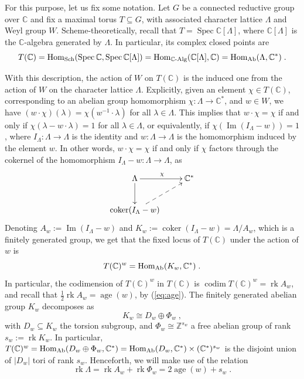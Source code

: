 \documentclass[11pt,english]{amsart}
\numberwithin{equation}{section}
\numberwithin{figure}{section}
\theoremstyle{plain}
\theoremstyle{plain}
\theoremstyle{definition}
\theoremstyle{remark}
\DeclareMathOperator{\image}{Im}
\newcommand{\ZZ}{\mathbb{Z}}
\newcommand{\CC}{\mathbb{C}}
\newcommand{\Spec}{\operatorname{Spec}}
\newcommand{\coker}{\operatorname{coker}}
\newcommand{\codim}{\operatorname{codim}}
\newcommand{\Hom}{\operatorname{Hom}}
\newcommand{\Sch}{\operatorname{Sch}}
\newcommand{\rk}{\operatorname{rk}}
\newcommand{\age}{\operatorname{age}}
\newcommand{\Ab}{\textup{Ab}}
\begin{document}
For this purpose, let us fix some notation. Let $G$ be a connected reductive group over $\CC$ and fix a maximal torus $T \subseteq G$, with associated character lattice $\Lambda$ and Weyl group $W$. Scheme-theoretically, recall that
$T = \Spec\CC[\Lambda]$, where $\CC[\Lambda]$ is the $\CC$-algebra generated by $\Lambda$. In particular, its complex closed points are
$$
    T(\CC) = \Hom_{\Sch}(\Spec \CC, \Spec \CC[\Lambda]) = \Hom_{\CC\text{-Alg}}(\CC[\Lambda], \CC) = \Hom_{\Ab}(\Lambda, \CC^*)\; .
$$

With this description, the action of $W$ on $T(\CC)$ is the induced one from the action of $W$ on the character lattice $\Lambda$. Explicitly, given an element $\chi \in T(\CC)$, corresponding to an abelian group homomorphism $\chi: \Lambda \to \CC^*$, and $w \in W$, we have $(w \cdot \chi)(\lambda) = \chi(w^{-1}\cdot \lambda)$ for all $\lambda \in \Lambda$. This implies that $w \cdot \chi = \chi$ if and only if $\chi(\lambda - w\cdot \lambda) = 1$ for all $\lambda \in \Lambda$, or equivalently, if $\chi(\image(I_{\Lambda} - w)) = 1$, where $I_{\Lambda}: \Lambda \to \Lambda$ is the identity and $w: \Lambda \to \Lambda$ is the homomorphism induced by the element $w$. In other words, $w \cdot \chi = \chi$ if and only if $\chi$ factors through the cokernel of the homomorphism $I_\Lambda -w: \Lambda \to \Lambda$, as
$$
\xymatrix{
    \Lambda \ar[r]^{\chi}\ar[d] & \CC^* \\
    \coker(I_\Lambda - w) \ar@{--{>}}[ru] &
}
$$
Denoting $A_w := \image(I_\Lambda - w)$ and $K_w := \coker(I_\Lambda - w) = \Lambda/A_w$, which is a finitely generated group, we get that the fixed locus of $T(\CC)$ under the action of $w$ is
$$
    T(\CC)^w = \Hom_{\Ab}(K_w, \CC^*)\; .
$$
In particular, the codimension of $T(\CC)^w$ in $T(\CC)$ is $\codim T(\CC)^w = \rk A_w$, and recall that $\frac{1}{2}\rk A_w = \age(w)$, by (\ref{eq:age}). The finitely generated abelian group $K_w$ decomposes as 
\begin{equation}\label{eq:free-torsion}
    K_w \cong D_w \oplus \Phi_w\; ,
\end{equation}
with $D_w \subseteq K_w$ the torsion subgroup, and $\Phi_w \cong \ZZ^{s_w}$ a free abelian group of rank $s_w:=\rk K_w$. In particular, $T(\CC)^w = \Hom_{\Ab}(D_w \oplus \Phi_w, \CC^*) = \Hom_{\Ab}(D_w, \CC^*) \times (\CC^*)^{s_w}$ is the disjoint union of $|D_w|$ tori of rank $s_w$.
Henceforth, we will make use of the relation
\begin{equation}
    \label{eq:ranks_lattices}
    \rk \Lambda = \rk A_w+\rk \Phi_w=2\age(w)+s_w\; .
\end{equation}
\end{document}
